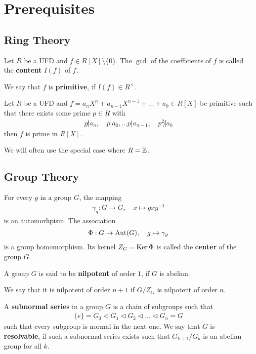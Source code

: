 \setcounter{section}{-1}

\section{Prerequisites}

\subsection{Ring Theory}

\begin{dfn}[]
  Let $R$ be a UFD and $f \in R[X] \setminus \{0\}$. The $\gcd$ of the coefficients of $f$ is called the \textbf{content} $I(f)$ of $f$.

  We say that $f$ is \textbf{primitive}, if $I(f) \in R^{\times}$.
\end{dfn}



\begin{thm}
  Let $R$ be a UFD and $f = a_nX^{n} + a_{n-1}X^{n-1} + \ldots + a_0 \in R[X]$ be primitive such that there exists some prime $p \in R$ with
  \begin{align*}
   p \not| a_n, \quad p|a_0, \ldots p|a_{n-1}, \quad p^{2}\not|a_0 
  \end{align*}
  then $f$ is prime in $R[X]$.
\end{thm}
We will often use the special case where $R = \mathbb{Z}$.

\subsection{Group Theory}
For every $g$ in a group $G$, the mapping
\begin{align*}
  \gamma_g: G \to G, \quad x \mapsto gxg^{-1}
\end{align*}
is an automorhpism. The association
\begin{align*}
  \Phi: G \to \operatorname{Aut}(G), \quad g \mapsto \gamma_g
\end{align*}
is a group homomorphism. Its kernel $Z_G = \operatorname{Ker} \Phi$ is called the \textbf{center} of the group $G$.
\begin{dfn}[]
A group $G$ is said to be \textbf{nilpotent} of order $1$, if $G$ is abelian.

We say that it is nilpotent of order $n+1$ if $G/Z_G$ is nilpotent of order $n$.
\end{dfn}
\begin{dfn}[]
A \textbf{subnormal series} in a group $G$ is a chain of subgroups such that
\begin{align*}
  \{e\} = G_0 \lhd G_1 \lhd G_2 \lhd  \ldots \lhd G_n = G
\end{align*}
such that every subgroup is normal in the next one.
We say that $G$ is \textbf{resolvable}, if such a subnormal series exists such that $G_{k+1}/G_k$ is an abelian group for all $k$.
\end{dfn}

